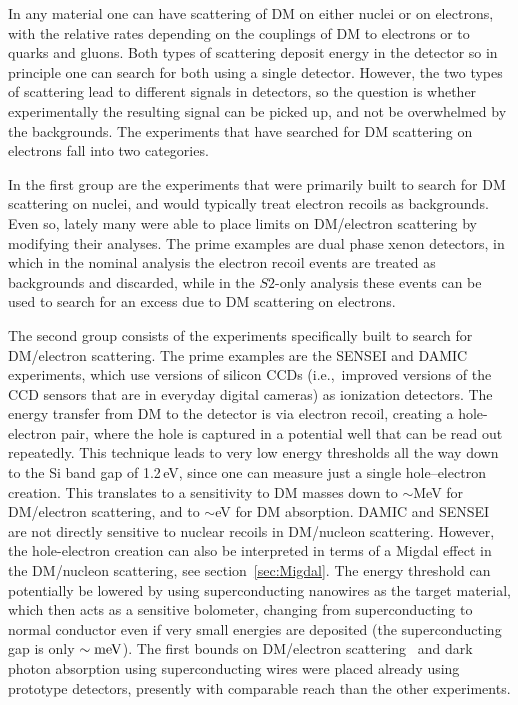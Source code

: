 In any material one can have scattering of DM on either nuclei or on electrons, with the relative rates depending on the couplings of DM to electrons or to quarks and gluons. Both types of scattering deposit energy in the detector so in principle one can  search for both using a single detector. 
However, the two types of scattering lead to different signals in detectors, 
so the question is whether experimentally the resulting signal can be picked up, and not be overwhelmed by the backgrounds. The experiments that have searched for DM scattering on electrons fall into two categories. 



In the first group are the experiments that were primarily built to search for DM scattering on nuclei, and would typically treat electron recoils as backgrounds. Even so, lately many were able to place limits on DM/electron scattering by modifying their analyses. The prime examples are dual phase xenon detectors, in which in the nominal analysis the electron recoil events are treated as backgrounds and discarded, while in the $S2$-only analysis these events can be used to search for an excess due to DM scattering on electrons. 


The second group consists of the experiments specifically built to search for DM/electron scattering. 
The prime examples are the SENSEI \cite{SENSEI} and DAMIC \cite{DAMIC} experiments, which use versions of silicon CCDs 
(i.e.,\ improved versions of the CCD sensors that are in everyday digital cameras) as ionization detectors. The energy transfer from DM to the detector is via electron recoil, creating a hole-electron pair, where the hole is captured in a potential well that can be read out repeatedly. This technique leads to very low energy thresholds all the way down to the Si band gap of 1.2\,eV, since one can measure just a single hole--electron creation. This translates to a sensitivity to DM masses down to $\sim$MeV for DM/electron scattering, and to $\sim$eV for DM absorption. 
DAMIC and SENSEI are not directly sensitive to nuclear recoils in DM/nucleon scattering. However, the hole-electron creation can also be interpreted in terms of a Migdal effect in the DM/nucleon scattering, see section~\ref{sec:Migdal}. 
The energy threshold can potentially be lowered by using superconducting nanowires as the target material, which then acts as a sensitive bolometer, changing from superconducting to normal conductor even if very small energies are deposited (the superconducting gap is only $\sim {\rm meV}$). 
The first bounds on DM/electron scattering~\cite{DM:electron:superconductors:nanowiresHochberg} and dark photon absorption \cite{LAMPOST} using superconducting wires were placed already using prototype detectors, presently with comparable reach than the other experiments. 

